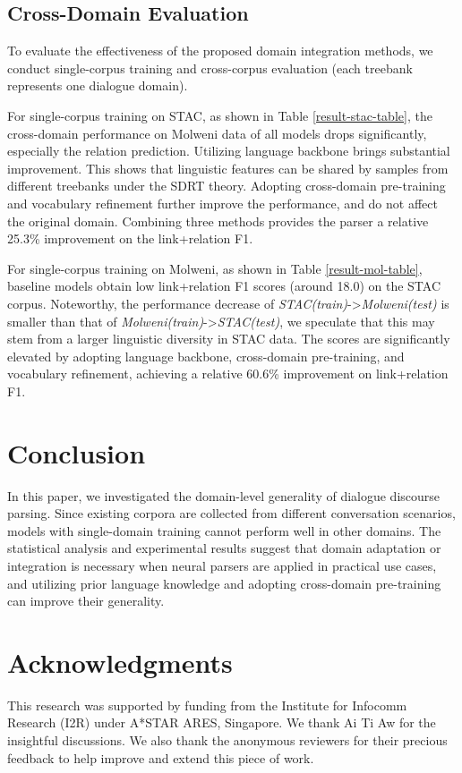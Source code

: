 \documentclass[11pt]{article}
\begin{document}
\subsection{Cross-Domain Evaluation}
To evaluate the effectiveness of the proposed domain integration methods, we conduct single-corpus training and cross-corpus evaluation (each treebank represents one dialogue domain).

For single-corpus training on STAC, as shown in Table \ref{result-stac-table}, the cross-domain performance on Molweni data of all models drops significantly, especially the relation prediction. Utilizing language backbone brings substantial improvement. This shows that linguistic features can be shared by samples from different treebanks under the SDRT theory. Adopting cross-domain pre-training and vocabulary refinement further improve the performance, and do not affect the original domain. Combining three methods provides the parser a relative 25.3\% improvement on the link+relation F1.

For single-corpus training on Molweni, as shown in Table \ref{result-mol-table}, baseline models obtain low link+relation F1 scores (around 18.0) on the STAC corpus. 
Noteworthy, the performance decrease of  \textit{STAC(train)}->\textit{Molweni(test)} is smaller than that of \textit{Molweni(train)}->\textit{STAC(test)}, we speculate that this may stem from a larger linguistic diversity in STAC data.
The scores are significantly elevated by adopting language backbone, cross-domain pre-training, and vocabulary refinement, achieving a relative 60.6\% improvement on link+relation F1.

\section{Conclusion}
In this paper, we investigated the domain-level generality of dialogue discourse parsing. Since existing corpora are collected from different conversation scenarios, models with single-domain training cannot perform well in other domains. The statistical analysis and experimental results suggest that domain adaptation or integration is necessary when neural parsers are applied in practical use cases, and utilizing prior language knowledge and adopting cross-domain pre-training can improve their generality.

\section*{Acknowledgments}
This research was supported by funding from the Institute for Infocomm Research (I2R) under A*STAR ARES, Singapore. We thank Ai Ti Aw for the insightful discussions. We also thank the anonymous reviewers for their precious feedback to help improve and extend this piece of work.




\newpage

\appendix
\end{document}
